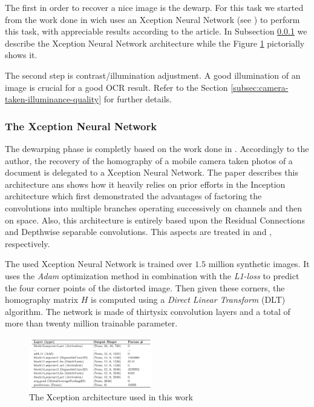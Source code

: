\documentclass[10pt,twocolumn,letterpaper]{article}
\begin{document}
The first in order to recover a nice image is the dewarp. For this
task we started from the work done in \cite{Korber18} wich uses an
Xception Neural Network (see \cite{Xception}) to perform this task,
with appreciable results according to the article. In Subsection
\ref{subsec:xception-nn-architecture} we describe the Xception Neural
Network architecture while the Figure \ref{fig:xception-architecture}
pictorially shows it.

The second step is contrast/illumination adjustment. A good
illumination of an image is crucial for a good OCR result. Refer to
the Section \ref{subsec:camera-taken-illuminance-quality} for further
details.

\subsubsection{The Xception Neural Network}
\label{subsec:xception-nn-architecture}

The dewarping phase is completly based on the work done in
\cite{Korber18}. Accordingly to the author, the recovery of the
homography of a mobile camera taken photos of a document is delegated
to a Xception Neural Network. The paper \cite{Xception} describes this
architecture ans shows how it heavily relies on prior efforts in the
Inception architecture which first demonstrated the advantages of
factoring the convolutions into multiple branches operating
successively on channels and then on space. Also, this architecture is
entirely based upon the Residual Connections and Depthwise separable
convolutions. This aspects are treated in \cite{Sahoo17} and
\cite{Wang18}, respectively.

The used Xception Neural Network is trained over $1.5$ million
synthetic images. It uses the \emph{Adam} optimization method in
combination with the \emph{L1-loss} to predict the four corner points
of the distorted image. Then given these corners, the homography
matrix $H$ is computed using a \emph{Direct Linear Transform} (DLT)
algorithm. The network is made of thirtysix convolution layers and a
total of more than twenty million trainable parameter.

\begin{figure}[!ht]
  \centering
  \includegraphics[width=0.48\textwidth]{images/xception-architecture.png}
  \caption{The Xception architecture used in this work}
  \label{fig:xception-architecture}
\end{figure}
\end{document}
